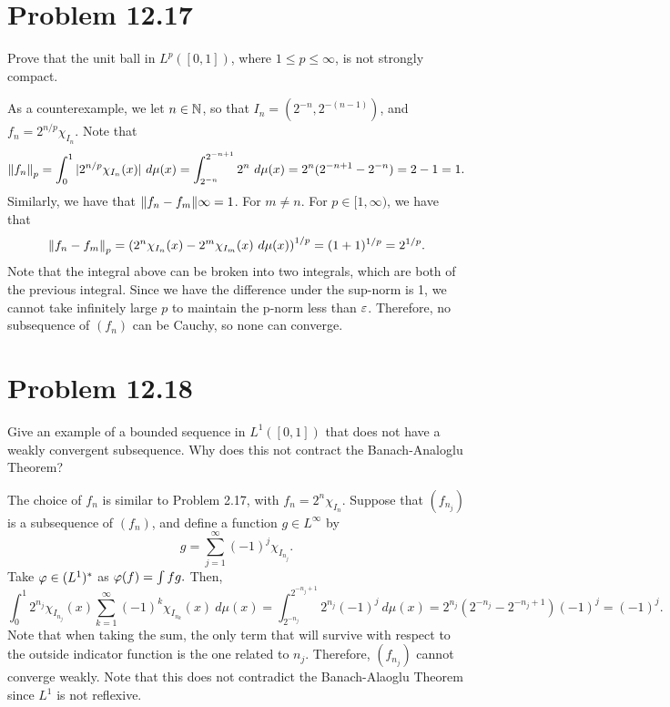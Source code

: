 \newpage
\section{Problem 12.17}
Prove that the unit ball in $L^p([0, 1])$, where $1 \leq p \leq \infty$, is not strongly compact.
\partbreak
\begin{solution}

    As a counterexample, we let $n \in \mathbb{N}$, so that $I_n = (2^{-n}, 2^{-(n-1)})$, and $f_n = 2^{n/p}\chi_{I_n}.$ Note that 
    \[\norm{f_n}_p = \int_0^1 |2^{n/p}\chi_{I_n}(x)| \ d\mu(x) = \int^{2^{-n+1}}_{2^{-n}} 2^n \ d\mu(x) = 2^n(2^{-n+1} - 2^{-n}) = 2 - 1 = 1.\]
    Similarly, we have that $\norm{f_n - f_m}\infty = 1$. For $m \neq n$. For $p \in [1, \infty)$, we have that
    \[\norm{f_n - f_m}_p = \left(2^n \chi_{I_n}(x) - 2^m \chi_{I_m}(x) \ d\mu(x)\right)^{1/p} = (1 + 1)^{1/p} = 2^{1/p}.\]
    Note that the integral above can be broken into two integrals, which are both of the previous integral. Since we have the difference under the sup-norm is 1, we cannot take infinitely large $p$ to maintain the p-norm less than $\varepsilon$. Therefore, no subsequence of $(f_n)$ can be Cauchy, so none can converge. 
\end{solution}


\newpage
\section{Problem 12.18}
Give an example of a bounded sequence in $L^1([0, 1])$ that does not have a weakly convergent subsequence. Why does this not contract the Banach-Analoglu Theorem?
\partbreak
\begin{solution}

    The choice of $f_n$ is similar to Problem 2.17, with $f_n = 2^n \chi_{I_n}$. Suppose that $(f_{n_j})$ is a subsequence of $(f_n)$, and define a function $g \in L^\infty$ by 
    \[g = \sum_{j = 1}^\infty (-1)^j \chi_{I_{n_j}}.\]
    Take $\varphi \in (L^1)^*$ as $\varphi (f) = \int fg.$ Then,
    \[\int_0^1 2^{n_j} \chi_{I_{n_j}}(x) \sum_{k = 1}^\infty (-1)^k\chi_{I_{n_k}}(x) \ d\mu(x) = \int_{2^{-n_j}}^{2^{-n_j + 1}} 2^{n_j} (-1)^j \ d\mu(x) = 2^{n_j}(2^{-n_j} - 2^{-n_j + 1})(-1)^j = (-1)^j. \]
    Note that when taking the sum, the only term that will survive with respect to the outside indicator function is the one related to $n_j$. Therefore, $(f_{n_j})$ cannot converge weakly. Note that this does not contradict the Banach-Alaoglu Theorem since $L^1$ is not reflexive.
\end{solution}

